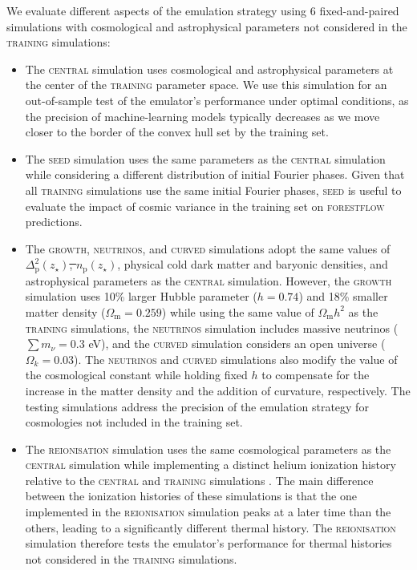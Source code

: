 \documentclass{aa}
\newcommand{\forestflow}{\textsc{forestflow}\xspace}
\newcommand{\lacehc}{\textsc{training}\xspace}
\newcommand{\simseed}{\textsc{seed}\xspace}
\newcommand{\simigm}{\textsc{reionisation}\xspace}
\newcommand{\simcurved}{\textsc{curved}\xspace}
\newcommand{\simh}{\textsc{growth}\xspace}
\newcommand{\simnu}{\textsc{neutrinos}\xspace}
\newcommand{\simcentral}{\textsc{central}\xspace}
\providecommand{\DIFaddtex}[1]{{\protect\color{blue}\uwave{#1}}} %
\providecommand{\DIFdeltex}[1]{{\protect\color{red}\sout{#1}}}                      %
\providecommand{\DIFaddbegin}{} %
\providecommand{\DIFaddend}{} %
\providecommand{\DIFdelbegin}{} %
\providecommand{\DIFdelend}{} %
\providecommand{\DIFadd}[1]{\texorpdfstring{\DIFaddtex{#1}}{#1}} %
\providecommand{\DIFdel}[1]{\texorpdfstring{\DIFdeltex{#1}}{}} %
\newcommand{\DIFscaledelfig}{0.5}
\newlength{\DIFdelgraphicswidth} %
\newlength{\DIFdelgraphicsheight} %
\newcommand{\DIFaddincludegraphics}[2][]{{\color{blue}\fbox{\DIFOincludegraphics[#1]{#2}}}} %
\newcommand{\DIFdelincludegraphics}[2][]{%
\sbox{\DIFdelgraphicsbox}{\DIFOincludegraphics[#1]{#2}}%
\settoboxwidth{\DIFdelgraphicswidth}{\DIFdelgraphicsbox} %
\settoboxtotalheight{\DIFdelgraphicsheight}{\DIFdelgraphicsbox} %
\scalebox{\DIFscaledelfig}{%
\parbox[b]{\DIFdelgraphicswidth}{\usebox{\DIFdelgraphicsbox}\\[-\baselineskip] \rule{\DIFdelgraphicswidth}{0em}}\llap{\resizebox{\DIFdelgraphicswidth}{\DIFdelgraphicsheight}{%
\setlength{\unitlength}{\DIFdelgraphicswidth}%
\begin{picture}(1,1)%
\thicklines\linethickness{2pt} %
{\color[rgb]{1,0,0}\put(0,0){\framebox(1,1){}}}%
{\color[rgb]{1,0,0}\put(0,0){\line( 1,1){1}}}%
{\color[rgb]{1,0,0}\put(0,1){\line(1,-1){1}}}%
\end{picture}%
}\hspace*{3pt}}} %
} %
\DeclareRobustCommand{\DIFaddbegin}{\DIFOaddbegin \let\includegraphics\DIFaddincludegraphics} %
\DeclareRobustCommand{\DIFaddend}{\DIFOaddend \let\includegraphics\DIFOincludegraphics} %
\DeclareRobustCommand{\DIFdelbegin}{\DIFOdelbegin \let\includegraphics\DIFdelincludegraphics} %
\DeclareRobustCommand{\DIFdelend}{\DIFOaddend \let\includegraphics\DIFOincludegraphics} %
\begin{document}
We evaluate different aspects of the emulation strategy using 6 fixed-and-paired simulations with cosmological and astrophysical parameters not considered in the \lacehc simulations:
%
\begin{itemize}
    \item The \simcentral simulation uses cosmological and astrophysical parameters at the center of the \lacehc parameter space\DIFaddbegin \DIFadd{: $A_\mathrm{s}=2.01\times10^{-9}$, $n_\mathrm{s}=0.97$, $z_\mathrm{H}=10.5$, $H_\mathrm{A}=1$, and $H_\mathrm{S}=1$}\DIFaddend . We use this simulation for an out-of-sample test of the emulator's performance under optimal conditions, as the precision of machine-learning models typically decreases as we move closer to the border of the convex hull set by the training set.

    \item The \simseed simulation uses the same parameters as the \simcentral simulation while considering a different distribution of initial Fourier phases. Given that all \lacehc simulations use the same initial Fourier phases, \simseed is useful to evaluate the impact of cosmic variance in the training set on \forestflow predictions.

    \item The \simh, \simnu, and \simcurved simulations adopt the same values of \DIFdelbegin \DIFdel{$\Delta^2_\mathrm{p}(z_\star)$, $n_\mathrm{p}(z_\star)$}\DIFdelend \DIFaddbegin \DIFadd{$\Delta^2_\mathrm{p}(z=3)$, $n_\mathrm{p}(z=3)$}\DIFaddend , physical cold dark matter and baryonic densities, and astrophysical parameters as the \simcentral simulation. However, the \simh simulation uses 10\% larger Hubble parameter ($h=0.74$) and 18\% smaller matter density (\DIFdelbegin \DIFdel{$\Omega_\mathrm{m}=0.259$}\DIFdelend \DIFaddbegin \DIFadd{$\Omega_\mathrm{M}=0.259$}\DIFaddend ) while using the same value of \DIFdelbegin \DIFdel{$\Omega_\mathrm{m} h^2$ }\DIFdelend \DIFaddbegin \DIFadd{$\Omega_\mathrm{M} h^2$ }\DIFaddend as the \lacehc simulations, the \simnu simulation includes massive neutrinos ($\sum m_\nu=0.3$ eV), and the \simcurved simulation considers an open universe ($\Omega_k=0.03$). The \simnu and \simcurved simulations also modify the value of the cosmological constant while holding fixed $h$ to compensate for the increase in the matter density and the addition of curvature, respectively. The testing simulations address the precision of the emulation strategy for cosmologies not included in the training set.

    \item The \simigm simulation uses the same cosmological parameters as the \simcentral simulation while implementing a distinct helium ionization history relative to the \simcentral and \lacehc simulations \citep{puchwein2019ConsistentModellingMetagalactic}. The main difference between the ionization histories of these simulations is that the one implemented in the \simigm simulation peaks at a later time than the others, leading to a significantly different thermal history. The \simigm simulation therefore tests the emulator's performance for thermal histories not considered in the \lacehc simulations.
\end{itemize}
\end{document}
